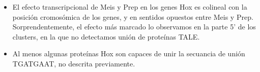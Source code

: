 \begin{itemize}
  \item El efecto transcripcional de Meis y Prep en los genes Hox es colineal con la posición cromosómica de los genes, y en sentidos opuestos entre Meis y Prep. Sorprendentemente, el efecto más marcado lo observamos en la parte 5' de los clusters, en la que no detectamos unión de proteínas \ac{TALE}.%
   
  \item Al menos algunas proteínas Hox son capaces de unir la secuancia de unión TGATGAAT, no descrita previamente. %

\end{itemize}
